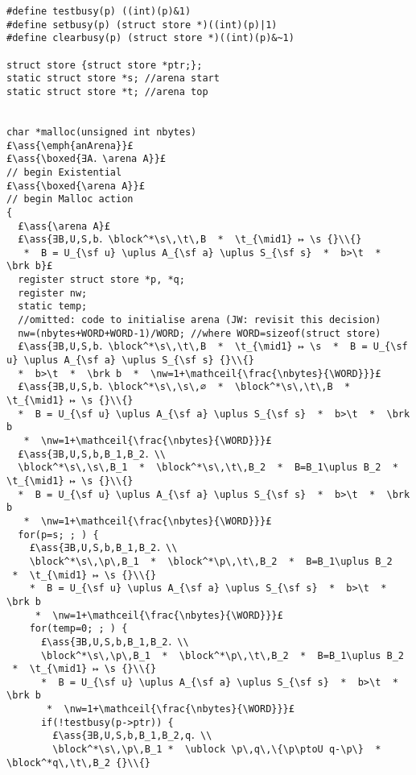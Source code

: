 \documentclass[12pt,a4paper]{article}
\makeatletter
\newcommand{\ml}[2][t]{\mbox{\mdseries\begin{tabular}[#1]{@{}L@{}}#2\end{tabular}}}
\newcommand{\ass}[1]{\ensuremath{{\color{blue}\left\{\ml[c]{#1}\right\}}}}
\makeatother
\begin{document}
\begin{lstlisting}
#define testbusy(p) ((int)(p)&1)
#define setbusy(p) (struct store *)((int)(p)|1)
#define clearbusy(p) (struct store *)((int)(p)&~1)

struct store {struct store *ptr;};
static struct store *s; //arena start
static struct store *t; //arena top


char *malloc(unsigned int nbytes) 
£\ass{\emph{anArena}}£
£\ass{\boxed{∃A．\arena A}}£
// begin Existential
£\ass{\boxed{\arena A}}£
// begin Malloc action
{
  £\ass{\arena A}£  
  £\ass{∃B,U,S,b．\block^*\s\,\t\,B  *  \t_{\mid1} ↦ \s {}\\{}
   *  B = U_{\sf u} \uplus A_{\sf a} \uplus S_{\sf s}  *  b>\t  *  \brk b}£
  register struct store *p, *q;
  register nw;
  static temp;
  //omitted: code to initialise arena (JW: revisit this decision)
  nw=(nbytes+WORD+WORD-1)/WORD; //where WORD=sizeof(struct store)
  £\ass{∃B,U,S,b．\block^*\s\,\t\,B  *  \t_{\mid1} ↦ \s  *  B = U_{\sf u} \uplus A_{\sf a} \uplus S_{\sf s} {}\\{}
  *  b>\t  *  \brk b  *  \nw=1+\mathceil{\frac{\nbytes}{\WORD}}}£
  £\ass{∃B,U,S,b．\block^*\s\,\s\,∅  *  \block^*\s\,\t\,B  *  \t_{\mid1} ↦ \s {}\\{}
  *  B = U_{\sf u} \uplus A_{\sf a} \uplus S_{\sf s}  *  b>\t  *  \brk b 
   *  \nw=1+\mathceil{\frac{\nbytes}{\WORD}}}£
  £\ass{∃B,U,S,b,B_1,B_2．\\
  \block^*\s\,\s\,B_1  *  \block^*\s\,\t\,B_2  *  B=B_1\uplus B_2  *  \t_{\mid1} ↦ \s {}\\{}
  *  B = U_{\sf u} \uplus A_{\sf a} \uplus S_{\sf s}  *  b>\t  *  \brk b 
   *  \nw=1+\mathceil{\frac{\nbytes}{\WORD}}}£
  for(p=s; ; ) { 
    £\ass{∃B,U,S,b,B_1,B_2．\\
    \block^*\s\,\p\,B_1  *  \block^*\p\,\t\,B_2  *  B=B_1\uplus B_2  *  \t_{\mid1} ↦ \s {}\\{}
    *  B = U_{\sf u} \uplus A_{\sf a} \uplus S_{\sf s}  *  b>\t  *  \brk b 
     *  \nw=1+\mathceil{\frac{\nbytes}{\WORD}}}£
    for(temp=0; ; ) {
      £\ass{∃B,U,S,b,B_1,B_2．\\
      \block^*\s\,\p\,B_1  *  \block^*\p\,\t\,B_2  *  B=B_1\uplus B_2  *  \t_{\mid1} ↦ \s {}\\{}
      *  B = U_{\sf u} \uplus A_{\sf a} \uplus S_{\sf s}  *  b>\t  *  \brk b 
       *  \nw=1+\mathceil{\frac{\nbytes}{\WORD}}}£
      if(!testbusy(p->ptr)) {
        £\ass{∃B,U,S,b,B_1,B_2,q．\\
        \block^*\s\,\p\,B_1 *  \ublock \p\,q\,\{\p\ptoU q-\p\}  *  \block^*q\,\t\,B_2 {}\\{}

\end{lstlisting}
\end{document}
